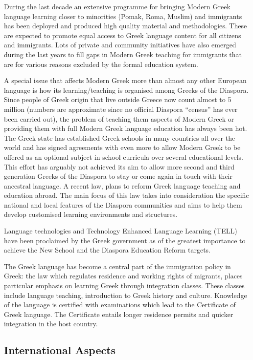\documentclass[]{../../metanetpaper}
\begin{document}
\begin{multicols}{2}
During the last decade an extensive programme for bringing Modern Greek language learning closer to minorities (Pomak, Roma, Muslim) and immigrants has been deployed and produced high quality material and methodologies. These are expected to promote equal access to Greek language content for all citizens and immigrants. Lots of private and community initiatives have also emerged during the last years to fill gaps in Modern Greek teaching for immigrants that are for various reasons excluded by the formal education system.

A special issue that affects Modern Greek more than almost any other European language is how its learning/teaching is organised among Greeks of the Diaspora. Since people of Greek origin that live outside Greece now count almost to 5 million (numbers are approximate since no official Diaspora “census” has ever been carried out), the problem of teaching them aspects of Modern Greek or providing them with full Modern Greek language education has always been hot. The Greek state has established Greek schools in many countries all over the world and has signed agreements with even more to allow Modern Greek to be offered as an optional subject in school curricula over several educational levels. This effort has arguably not achieved its aim to allow more second and third generation Greeks of the Diaspora to stay or come again in touch with their ancestral language. A recent law, plans to reform Greek language teaching and education abroad. The main focus of this law  takes into consideration the specific national and local features of the Diaspora communities and aims to help them develop customised learning environments and structures.

Language technologies and Technology Enhanced Language Learning (TELL) have been proclaimed by the Greek government as of the greatest importance to achieve the New School and the Diaspora Education Reform targets.

The Greek language has become a central part of the immigration policy in Greek: the law which regulates residence and working rights of migrants, places particular emphasis on learning Greek through integration classes. These classes include language teaching, introduction to Greek history and culture. Knowledge of the language is certified with examinations which lead to the Certificate of Greek language. The Certificate entails longer residence permits and quicker integration in the host country.

\subsection{International Aspects}


\end{multicols}
\end{document}
